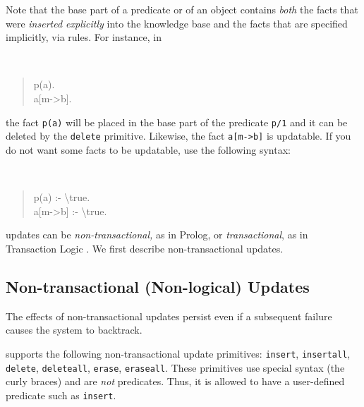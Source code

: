\documentclass[11pt]{article}
\newcommand{\ERGO}{\mbox{\smaller{\ensuremath{\cal{E}}\smaller{{\sc{RGO}}}}}\xspace}
\newcommand{\FLSYSTEM}{\ERGO}
\newcommand{\bs}{\textbackslash}
\begin{document}
Note that the base part of a predicate or of an object contains \emph{both}
the facts that were \emph{inserted explicitly} into the knowledge base and the
facts that are specified implicitly, via rules. For instance, in
{\tt
\begin{quote}
 p(a).\\
 a[m->b].
\end{quote}
}
\noindent
the fact {\tt p(a)} will be placed in the base part of the
predicate {\tt p/1}  and it can be deleted by the {\tt delete}
primitive. Likewise, the fact {\tt a[m->b]} is updatable. If you do not
want some facts to be updatable, use the following syntax:
{\tt
\begin{quote}
 p(a) :- \bs{}true.\\
 a[m->b] :- \bs{}true.
\end{quote}
}


\FLSYSTEM updates can be \emph{non-transactional,} as in Prolog, or
\emph{transactional}, as in Transaction Logic
\cite{trans-chapter-98,trans-tcs94}.  We first describe non-transactional
updates.


\subsection{Non-transactional (Non-logical) Updates}
\label{sec:non-transactional-updates}

%
The effects of non-transactional updates persist even if a subsequent failure
causes the system to backtrack.

\FLSYSTEM supports the following non-transactional update primitives:
{\tt insert}, {\tt insertall}, {\tt delete}, {\tt deleteall},
{\tt erase}, {\tt eraseall}. These primitives use special syntax (the curly
braces) and are \emph{not} predicates. Thus, it is allowed to have a
user-defined predicate such as {\tt insert}.

%
\end{document}
